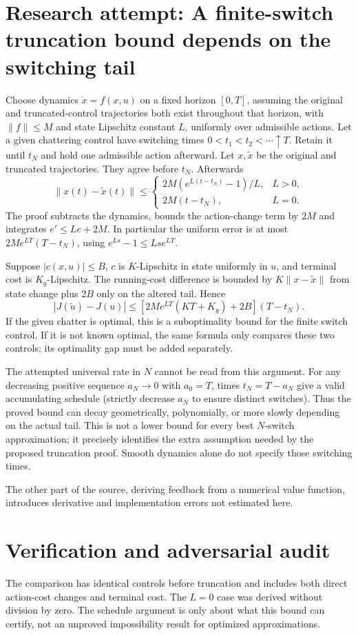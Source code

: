 \documentclass[11pt]{article}
\begin{document}
\section{Research attempt: A finite-switch truncation bound depends on the switching tail}
Choose dynamics $\dot x=f(x,u)$ on a fixed horizon $[0,T]$, assuming the
original and truncated-control trajectories both exist throughout that horizon, with
$\|f\|\le M$ and state Lipschitz constant $L$, uniformly over admissible
actions. Let a given chattering control have switching times
$0<t_1<t_2<\cdots\uparrow T$. Retain it until $t_N$ and hold one admissible
action afterward. Let $x,\widetilde x$ be the original and truncated trajectories.
They agree before $t_N$. Afterwards
\[
 \|x(t)-\widetilde x(t)\|\le
 \begin{cases}2M(e^{L(t-t_N)}-1)/L,&L>0,\\2M(t-t_N),&L=0.\end{cases}
\]
The proof subtracts the dynamics, bounds the action-change term by $2M$ and
integrates $e'\le Le+2M$. In particular the uniform error is at most
$2Me^{LT}(T-t_N)$, using $e^{Ls}-1\le Lse^{LT}$.

Suppose $|c(x,u)|\le B$, $c$ is $K$-Lipschitz in state uniformly in $u$,
and terminal cost is $K_g$-Lipschitz. The running-cost difference is bounded
by $K\|x-\widetilde x\|$ from state change plus $2B$ only on the altered
tail. Hence
\[
 |J(\widetilde u)-J(u)|
 \le[2M e^{LT}(KT+K_g)+2B](T-t_N).
\]
If the given chatter is optimal, this is a suboptimality bound for the finite
switch control. If it is not known optimal, the same formula only compares
these two controls; its optimality gap must be added separately.

The attempted universal rate in $N$ cannot be read from this argument.
For any decreasing positive sequence $a_N\to0$ with $a_0=T$, times
$t_N=T-a_N$ give a valid accumulating schedule (strictly decrease $a_N$ to
ensure distinct switches). Thus the proved bound can decay geometrically,
polynomially, or more slowly depending on the actual tail. This is not a
lower bound for every best $N$-switch approximation; it precisely identifies
the extra assumption needed by the proposed truncation proof. Smooth dynamics
alone do not specify those switching times.

The other part of the source, deriving feedback from a numerical value
function, introduces derivative and implementation errors not estimated here.
\section{Verification and adversarial audit}
The comparison has identical controls before truncation and includes
both direct action-cost changes and terminal cost. The $L=0$ case was derived
without division by zero. The schedule argument is only about what this bound
can certify, not an unproved impossibility result for optimized approximations.
\end{document}
